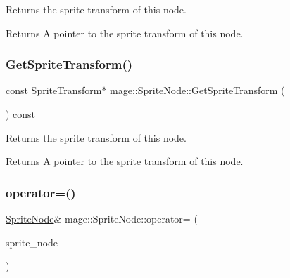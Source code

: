 Returns the sprite transform of this node.

\begin{DoxyReturn}{Returns}
A pointer to the sprite transform of this node. 
\end{DoxyReturn}
\hypertarget{classmage_1_1_sprite_node_a021d8d7d51a05330bfa6d034482988a0}{}\label{classmage_1_1_sprite_node_a021d8d7d51a05330bfa6d034482988a0} 
\subsubsection{\texorpdfstring{Get\+Sprite\+Transform()}{GetSpriteTransform()}\hspace{0.1cm}{\footnotesize\ttfamily [2/2]}}
{\footnotesize\ttfamily const Sprite\+Transform$\ast$ mage\+::\+Sprite\+Node\+::\+Get\+Sprite\+Transform (\begin{DoxyParamCaption}{ }\end{DoxyParamCaption}) const\hspace{0.3cm}{\ttfamily [noexcept]}}

Returns the sprite transform of this node.

\begin{DoxyReturn}{Returns}
A pointer to the sprite transform of this node. 
\end{DoxyReturn}
\hypertarget{classmage_1_1_sprite_node_a009228c9f53671a4275534ceb7733bd0}{}\label{classmage_1_1_sprite_node_a009228c9f53671a4275534ceb7733bd0} 
\subsubsection{\texorpdfstring{operator=()}{operator=()}\hspace{0.1cm}{\footnotesize\ttfamily [1/2]}}
{\footnotesize\ttfamily \hyperlink{classmage_1_1_sprite_node}{Sprite\+Node}\& mage\+::\+Sprite\+Node\+::operator= (\begin{DoxyParamCaption}\item[{const \hyperlink{classmage_1_1_sprite_node}{Sprite\+Node} \&}]{sprite\+\_\+node }\end{DoxyParamCaption})\hspace{0.3cm}{\ttfamily [delete]}}


